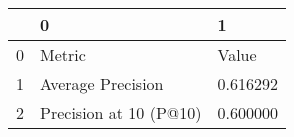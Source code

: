 \begin{tabular}{lll}
\toprule
 & 0 & 1 \\
\midrule
0 & Metric & Value \\
1 & Average Precision & 0.616292 \\
2 & Precision at 10 (P@10) & 0.600000 \\
\bottomrule
\end{tabular}
